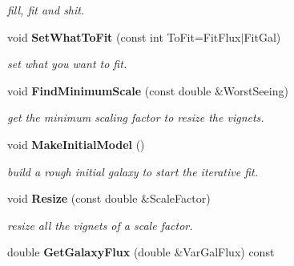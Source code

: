 \begin{CompactItemize}
\begin{CompactList}\small\item\em fill, fit and shit.\item\end{CompactList}\item 
{}
void {\bf Set\-What\-To\-Fit} (const int To\-Fit=Fit\-Flux$|$Fit\-Gal)\label{class_simultaneousfit_a11}

\begin{CompactList}\small\item\em set what you want to fit.\item\end{CompactList}\item 
{}
void {\bf Find\-Minimum\-Scale} (const double \&Worst\-Seeing)\label{class_simultaneousfit_a12}

\begin{CompactList}\small\item\em get the minimum scaling factor to resize the vignets.\item\end{CompactList}\item 
{}
void {\bf Make\-Initial\-Model} ()\label{class_simultaneousfit_a13}

\begin{CompactList}\small\item\em build a rough initial galaxy to start the iterative fit.\item\end{CompactList}\item 
{}
void {\bf Resize} (const double \&Scale\-Factor)\label{class_simultaneousfit_a14}

\begin{CompactList}\small\item\em resize all the vignets of a scale factor.\item\end{CompactList}\item 
{}
double {\bf Get\-Galaxy\-Flux} (double \&Var\-Gal\-Flux) const\label{class_simultaneousfit_a15}


\end{CompactItemize}
